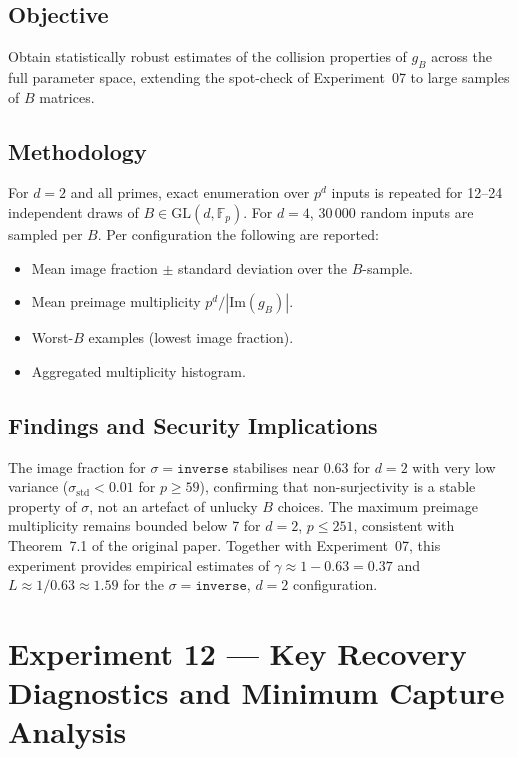 \documentclass[12pt,a4paper]{article}
\theoremstyle{definition}
\newcommand{\Fp}{\mathbb{F}_p}
\newcommand{\GL}{\mathrm{GL}}
\newcommand{\Img}{\mathrm{Im}}
\begin{document}
\subsection{Objective}

Obtain statistically robust estimates of the collision properties of
$g_B$ across the full parameter space, extending the spot-check of
Experiment~07 to large samples of $B$ matrices.

\subsection{Methodology}

For $d = 2$ and all primes, exact enumeration over $p^d$ inputs is
repeated for 12--24 independent draws of $B \in \GL(d,\Fp)$.
For $d = 4$, 30\,000 random inputs are sampled per $B$.
Per configuration the following are reported:
\begin{itemize}
  \item Mean image fraction $\pm$ standard deviation over the
    $B$-sample.
  \item Mean preimage multiplicity $p^d / |\Img(g_B)|$.
  \item Worst-$B$ examples (lowest image fraction).
  \item Aggregated multiplicity histogram.
\end{itemize}

\subsection{Findings and Security Implications}

The image fraction for $\sigma = \texttt{inverse}$ stabilises near
$0.63$ for $d = 2$ with very low variance ($\sigma_{\text{std}} < 0.01$
for $p \geq 59$), confirming that non-surjectivity is a stable
property of $\sigma$, not an artefact of unlucky $B$ choices.
The maximum preimage multiplicity remains bounded below 7 for
$d = 2$, $p \leq 251$, consistent with Theorem~7.1 of the original
paper. Together with Experiment~07, this experiment provides
empirical estimates of $\gamma \approx 1 - 0.63 = 0.37$ and
$L \approx 1/0.63 \approx 1.59$ for the $\sigma = \texttt{inverse}$,
$d = 2$ configuration.

\section{Experiment 12 --- Key Recovery Diagnostics and Minimum Capture Analysis}
\end{document}
